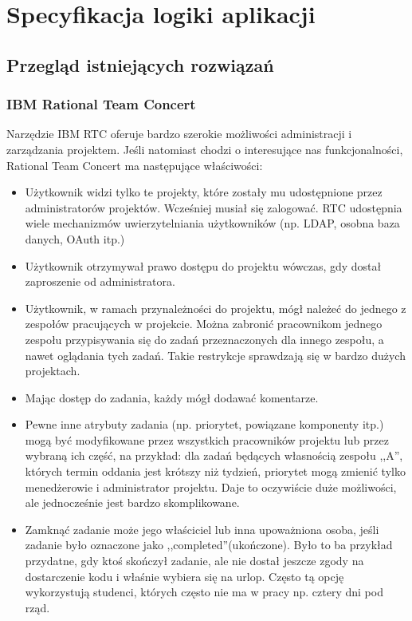 \documentclass[a4paper,12pt,notitlepage]{mwrep}
\begin{document}
\chapter{Specyfikacja logiki aplikacji}
\section{Przegląd istniejących rozwiązań}
\subsection{IBM Rational Team Concert}
Narzędzie IBM RTC oferuje bardzo szerokie możliwości administracji i zarządzania projektem. Jeśli natomiast chodzi o interesujące nas funkcjonalności, Rational Team Concert ma następujące właściwości:
\begin{itemize}
	\item	Użytkownik widzi tylko te projekty, które zostały mu udostępnione przez administratorów projektów. Wcześniej musiał się zalogować. RTC udostępnia wiele mechanizmów uwierzytelniania użytkowników (np. LDAP, osobna baza danych, OAuth itp.)
	\item	Użytkownik otrzymywał prawo dostępu do projektu wówczas, gdy dostał zaproszenie od administratora.
	\item	Użytkownik, w ramach przynależności do projektu, mógł należeć do jednego z zespołów pracujących w projekcie. Można zabronić pracownikom jednego zespołu przypisywania się do zadań przeznaczonych dla innego zespołu, a nawet oglądania tych zadań. Takie restrykcje sprawdzają się w bardzo dużych projektach.
	\item	Mając dostęp do zadania, każdy mógł dodawać komentarze.
	\item	Pewne inne atrybuty zadania (np. priorytet, powiązane komponenty itp.) mogą być modyfikowane przez wszystkich pracowników projektu lub przez wybraną ich część, na przykład: dla zadań będących własnością zespołu ,,A'', których termin oddania jest krótszy niż tydzień, priorytet mogą zmienić tylko menedżerowie i administrator projektu. Daje to oczywiście duże możliwości, ale jednocześnie jest bardzo skomplikowane.
	\item	Zamknąć zadanie może jego właściciel lub inna upoważniona osoba, jeśli zadanie było oznaczone jako ,,completed''(ukończone). Było to ba przykład przydatne, gdy ktoś skończył zadanie, ale nie dostał jeszcze zgody na dostarczenie kodu i właśnie wybiera się na urlop. Często tą opcję wykorzystują studenci, których często nie ma w pracy np. cztery dni pod rząd.
\end{itemize}
\end{document}
